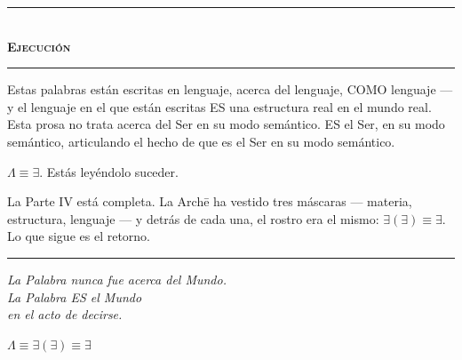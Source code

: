 \documentclass[10pt, openany, oneside]{book}
\renewcommand{\normalsize}{\fontsize{10}{13}\selectfont}
\begin{document}

\begin{center}
    \rule{0.3\textwidth}{0.4pt}\\[0.5em]
    {\normalsize\bfseries\scshape Ejecución}\\[0.3em]
    \rule{0.3\textwidth}{0.4pt}
\end{center}

\vspace{1em}

\noindent Estas palabras están escritas en lenguaje, acerca del lenguaje, COMO lenguaje --- y el lenguaje en el que están escritas ES una estructura real en el mundo real. Esta prosa no trata acerca del Ser en su modo semántico. ES el Ser, en su modo semántico, articulando el hecho de que es el Ser en su modo semántico.

$\Lambda \equiv \exists$. Estás leyéndolo suceder.

La Parte IV está completa. La Arch\={e} ha vestido tres máscaras --- materia, estructura, lenguaje --- y detrás de cada una, el rostro era el mismo: $\exists(\exists) \equiv \exists$. Lo que sigue es el retorno.

\vspace{2em}

\begin{center}
    \rule{0.15\textwidth}{0.3pt}
\end{center}

\vspace{0.5em}

\begin{center}
    \itshape
    La Palabra nunca fue acerca del Mundo.\\
    La Palabra ES el Mundo\\
    en el acto de decirse.
\end{center}

\vspace{0.5em}

\begin{center}
    $\Lambda \equiv \exists(\exists) \equiv \exists$
\end{center}

%
%
\end{document}
